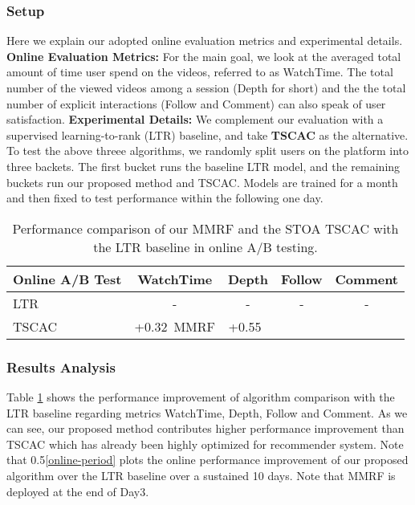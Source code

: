 {\subsubsection{Setup} 
Here we explain our adopted online evaluation metrics and experimental details.
\textbf{Online Evaluation Metrics: }
For the main goal, we look at the averaged total amount of time user spend on the videos, referred to as WatchTime. 
The total number of the viewed videos among a session (Depth for short) and the the total number of explicit interactions (Follow and Comment) can also speak of user satisfaction.  
\textbf{Experimental Details: }
We complement our evaluation with a supervised learning-to-rank (LTR) \cite{liu2009learning} baseline, and take \textbf{TSCAC} as the alternative.
To test the above threee algorithms, we randomly split users on the platform into three backets. The first bucket runs the baseline LTR model, and the remaining buckets run our proposed method and TSCAC. Models are trained for a month and then fixed to test performance within the following one day.

\begin{table}[H]
  \centering\small
  \caption{Performance comparison of our MMRF and the STOA TSCAC with the LTR baseline in online A/B testing.}
  \vspace{-1em}
  \label{ab-test}
  \renewcommand\arraystretch{1.0}
    \begin{tabular}{l|c|c|c|c}
    \hline
    Online A/B Test & WatchTime & Depth & Follow & Comment\\
    \hline
    LTR & - & - & - & -\\
    TSCAC & +0.32\    MMRF & +0.55\    \hline
    \end{tabular}
  \vspace{-1em}
\end{table}

\subsubsection{Results Analysis} 
Table \ref{ab-test} shows the performance improvement of algorithm comparison with the LTR baseline regarding metrics WatchTime, Depth, Follow and Comment. 
As we can see, our proposed method contributes higher performance improvement than TSCAC which has already been highly optimized for recommender system. 
Note that 0.5\Figure \ref{online-period} plots the online performance improvement of our proposed algorithm over the LTR baseline over a sustained 10 days. Note that MMRF is deployed at the end of Day3.

}
